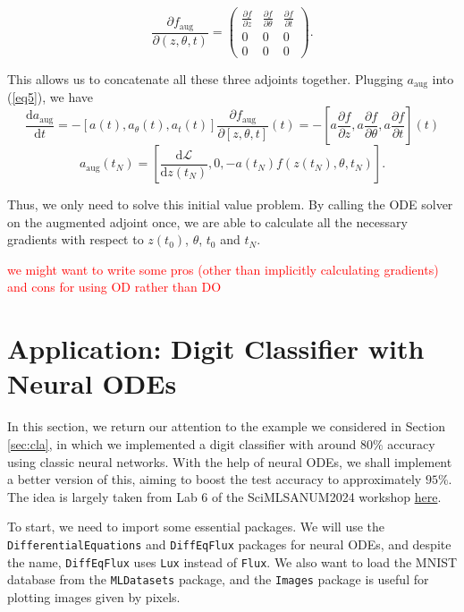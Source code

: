 \documentclass[a4paper,11pt,titlepage]{article}
\theoremstyle{definition}
\theoremstyle{plain}
\theoremstyle{remark}
\begin{document}
\[
\frac{\partial f_{\mathrm{aug}}}{\partial (z, \theta, t)} = 
\begin{pmatrix}
\frac{\partial f}{\partial z} & \frac{\partial f}{\partial \theta} & \frac{\partial f}{\partial t} \\
0 & 0 & 0 \\
0 & 0 & 0 
\end{pmatrix}.
\]

This allows us to concatenate all these three adjoints together. Plugging $a_{\mathrm{aug}}$ into (\ref{eq5}), we have
$$
\frac{\mathrm{d}a_{\mathrm{aug}}}{\mathrm{d}t} = -[a(t), a_\theta(t), a_t(t)]\frac{\partial f_{\mathrm{aug}}}{\partial [z,\theta,t]}(t)=-\left[a\frac{\partial f}{\partial z},a\frac{\partial f}{\partial \theta},a\frac{\partial f}{\partial t}\right](t)
$$
$$
a_{\mathrm{aug}}(t_N)=\left[\frac{\mathrm{d}\mathcal{L}}{\mathrm{d} z(t_N)},0,-a(t_N)f(z(t_N),\theta, t_N)\right].
$$

Thus, we only need to solve this initial value problem. By calling the ODE solver on the augmented adjoint once, we are able to calculate all the necessary gradients with respect to $z(t_0)$, $\theta$, $t_0$ and $t_N$.

\textcolor{red}{we might want to write some pros (other than implicitly calculating gradients) and cons for using OD rather than DO}

\pagebreak
\section{Application: Digit Classifier with Neural ODEs}
\label{sec:app}

In this section, we return our attention to the example we considered in Section \ref{sec:cla}, in which we implemented a digit classifier with around $80\%$ accuracy using classic neural networks. With the help of neural ODEs, we shall implement a better version of this, aiming to boost the test accuracy to approximately $95\%$. The idea is largely taken from Lab 6 of the SciMLSANUM2024 workshop \hyperlink{https://github.com/dlfivefifty/SciMLSANUM2024/blob/main/labs/lab6s.ipynb}{here}.

To start, we need to import some essential packages. We will use the \verb|DifferentialEquations| and \verb|DiffEqFlux| packages for neural ODEs, and despite the name, \verb|DiffEqFlux| uses \verb|Lux| instead of \verb|Flux|. We also want to load the MNIST database from the \verb|MLDatasets| package, and the \verb|Images| package is useful for plotting images given by pixels.
\end{document}
